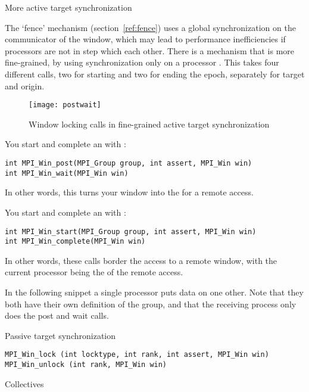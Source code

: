  {More active target synchronization}

The `fence' mechanism (section~\ref{ref:fence}) uses a global synchronization on the
communicator of the window, which may 
lead to performance inefficiencies if processors are not in step which each other. 
There is a mechanism that is more fine-grained, by using synchronization only 
on a processor . This takes four different calls, two for starting
and two for ending the epoch, separately for target and origin.
\begin{figure}[ht]
  \texttt{[image: postwait]}
  \caption{Window locking calls in fine-grained active target synchronization}
  \label{fig:postwait}
\end{figure}

You start and complete an  with%
:
\begin{verbatim}
int MPI_Win_post(MPI_Group group, int assert, MPI_Win win)
int MPI_Win_wait(MPI_Win win)
\end{verbatim}
In other words, this turns your window into the  for a remote access.

You start and complete an  with%
:
\begin{verbatim}
int MPI_Win_start(MPI_Group group, int assert, MPI_Win win)
int MPI_Win_complete(MPI_Win win)
\end{verbatim}
In other words, these calls border the access to a remote window, with the current processor
being the  of the remote access.

In the following snippet a single processor puts data on one
other. Note that they both have their own definition of the group, and
that the receiving process only does the post and wait calls.

 {Passive target synchronization}

\begin{verbatim}
MPI_Win_lock (int locktype, int rank, int assert, MPI_Win win)
MPI_Win_unlock (int rank, MPI_Win win)
\end{verbatim}


 {Collectives}

